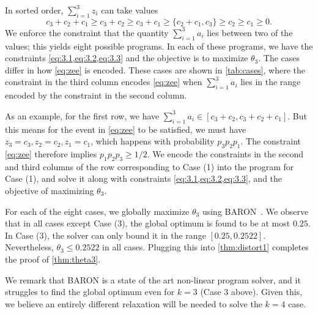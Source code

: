 In sorted order, $\sum_{i=1}^3 z_i$ can take values 
$$ c_3 + c_2 + c_1 \ge c_3 + c_2 \ge c_3 + c_1 \ge \{c_2 + c_1, c_3 \} \ge c_2 \ge c_1 \ge 0.$$
We enforce the constraint that the quantity $\sum_{i=1}^3 a_i$ lies between two of the values; this yields eight possible programs. In each of these programs, we have the constraints \cref{eq:3.1,eq:3.2,eq:3.3} and the objective is to maximize $\theta_3$. The cases differ in how \cref{eq:zee} is encoded. These cases are shown in \cref{tab:cases}, where the constraint in the third column encodes \cref{eq:zee} when $\sum_{i=1}^3 a_i$ lies in the range encoded by the constraint in the second column. 

As an example, for the first row, we have $\sum_{i=1}^3 a_i \in [c_3 + c_2, c_3 + c_2 + c_1]$. But this means for the event in \cref{eq:zee} to be satisfied, we must have $z_3 = c_3, z_2 = c_2, z_1 = c_1$, which happens with probability $p_3 p_2 p_1$. The constraint \cref{eq:zee} therefore implies $p_1 p_2 p_3 \ge 1/2$. We encode the constraints in the second and third columns of the row corresponding to Case (1) into the program for Case (1), and solve it along with constraints \cref{eq:3.1,eq:3.2,eq:3.3}, and the objective of maximizing $\theta_3$.



For each of the eight cases, we globally maximize $\theta_3$ using BARON~\cite{Sahinidis1996,KS18}. We observe that in all cases except Case (3), the global optimum is found to be at most $0.25$. In Case (3), the solver can only bound it in the range $[0.25, 0.2522]$. Nevertheless, $\theta_3 \le 0.2522$ in all cases. Plugging this into \cref{thm:distort1} completes the proof of \cref{thm:theta3}. 

We remark that BARON is a state of the art non-linear program solver, and it struggles to find the global optimum even for $k=3$ (Case 3 above). Given this, we believe an entirely different relaxation will be needed to solve the $k=4$ case.



